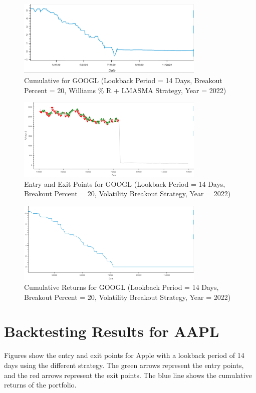 \begin{figure}[h!]
\centering
\includegraphics[width=0.8\textwidth]{Images/google_williams_lma__2.png}
\caption{Cumulative for GOOGL (Lookback Period = 14 Days, Breakout Percent = 20, Williams \% R + LMASMA Strategy, Year = 2022)}
\label{fig:entryexit1}
\end{figure}

\begin{figure}[h!]
\centering
\includegraphics[width=0.8\textwidth]{Images/google_volaitity_1.png}
\caption{Entry and Exit Points for GOOGL (Lookback Period = 14 Days, Breakout Percent = 20, Volatility Breakout Strategy, Year = 2022)}
\label{fig:entryexit1}
\end{figure}

\begin{figure}[h!]
\centering
\includegraphics[width=0.8\textwidth]{Images/google_volaitity_2.png}
\caption{Cumulative Returns for GOOGL (Lookback Period = 14 Days, Breakout Percent = 20, Volatility Breakout Strategy, Year = 2022)}
\label{fig:entryexit1}
\end{figure}

\section{Backtesting Results for AAPL}
Figures show the entry and exit points for Apple with a lookback period of 14 days using the different strategy. The green arrows represent the entry points, and the red arrows represent the exit points. The blue line shows the cumulative returns of the portfolio.

